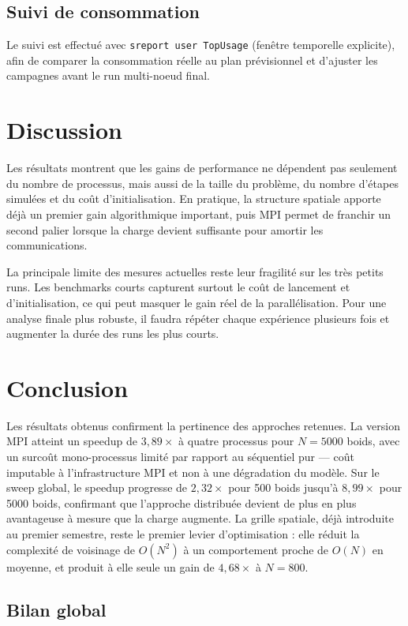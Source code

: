 \documentclass[conference]{IEEEtran}
\begin{document}
\subsection{Suivi de consommation}
Le suivi est effectué avec \texttt{sreport user TopUsage} (fenêtre temporelle explicite), afin de comparer la consommation réelle au plan prévisionnel et d'ajuster les campagnes avant le run multi-noeud final.

\section{Discussion}
Les résultats montrent que les gains de performance ne dépendent pas seulement du nombre de processus, mais aussi de la taille du problème, du nombre d'étapes simulées et du coût d'initialisation. En pratique, la structure spatiale apporte déjà un premier gain algorithmique important, puis MPI permet de franchir un second palier lorsque la charge devient suffisante pour amortir les communications.

La principale limite des mesures actuelles reste leur fragilité sur les très petits runs. Les benchmarks courts capturent surtout le coût de lancement et d'initialisation, ce qui peut masquer le gain réel de la parallélisation. Pour une analyse finale plus robuste, il faudra répéter chaque expérience plusieurs fois et augmenter la durée des runs les plus courts.

\section{Conclusion}

Les résultats obtenus confirment la pertinence des approches retenues.
La version MPI atteint un speedup de $3{,}89\times$ à quatre processus
pour $N = 5000$ boids, avec un surcoût mono-processus limité par rapport
au séquentiel pur — coût imputable à l'infrastructure MPI et non à une
dégradation du modèle. Sur le sweep global, le speedup progresse de
$2{,}32\times$ pour 500 boids jusqu'à $8{,}99\times$ pour 5000 boids,
confirmant que l'approche distribuée devient de plus en plus avantageuse
à mesure que la charge augmente. La grille spatiale, déjà introduite au
premier semestre, reste le premier levier d'optimisation : elle réduit
la complexité de voisinage de $O(N^2)$ à un comportement proche de
$O(N)$ en moyenne, et produit à elle seule un gain de $4{,}68\times$
à $N = 800$.


\subsection*{Bilan global}
\end{document}
